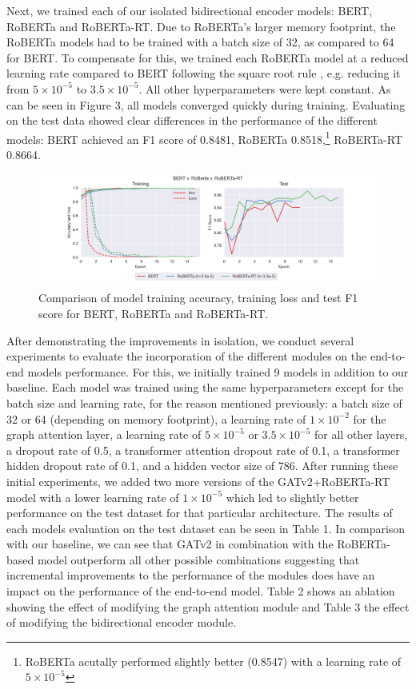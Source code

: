 \documentclass[letterpaper]{article} %
\begin{document}
Next, we trained each of our isolated bidirectional encoder models: BERT, RoBERTa and RoBERTa-RT. Due to RoBERTa's larger memory footprint, the RoBERTa models had to be trained with a batch size of 32, as compared to 64 for BERT. To compensate for this, we trained each RoBERTa model at a reduced learning rate compared to BERT following the square root rule \citep{Granziol2022}, e.g. reducing it from $5\times 10^{-5}$ to $3.5\times 10^{-5}$. All other hyperparameters were kept constant. As can be seen in Figure 3, all models converged quickly during training. Evaluating on the test data showed clear differences in the performance of the different models: BERT achieved an F1 score of 0.8481, RoBERTa 0.8518,\footnote{RoBERTa acutally performed slightly better (0.8547) with a learning rate of $5\times 10^{-5}$} RoBERTa-RT 0.8664.

\begin{figure}[!h]
    \includegraphics[width=\linewidth]{all_berts.png}
    \caption{Comparison of model training accuracy, training loss and test F1 score for BERT, RoBERTa and RoBERTa-RT.}
\end{figure}

After demonstrating the improvements in isolation, we conduct several experiments to evaluate the incorporation of the different modules on the end-to-end models performance. For this, we initially trained 9 models in addition to our baseline. Each model was trained using the same hyperparameters except for the batch size and learning rate, for the reason mentioned previously: a batch size of 32 or 64 (depending on memory footprint), a learning rate of $1\times 10^{-2}$ for the graph attention layer, a learning rate of $5\times 10^{-5}$ or $3.5\times 10^{-5}$ for all other layers, a dropout rate of 0.5, a transformer attention dropout rate of 0.1, a transformer hidden dropout rate of 0.1, and a hidden vector size of 786. After running these initial experiments, we added two more versions of the GATv2+RoBERTa-RT model with a lower learning rate of $1\times 10^{-5}$ which led to slightly better performance on the test dataset for that particular architecture. The results of each models evaluation on the test dataset can be seen in Table 1. In comparison with our baseline, we can see that GATv2 in combination with the RoBERTa-based model outperform all other possible combinations suggesting that incremental improvements to the performance of the modules does have an impact on the performance of the end-to-end model. Table 2 shows an ablation showing the effect of modifying the graph attention module and Table 3 the effect of modifying the bidirectional encoder module.
\end{document}
